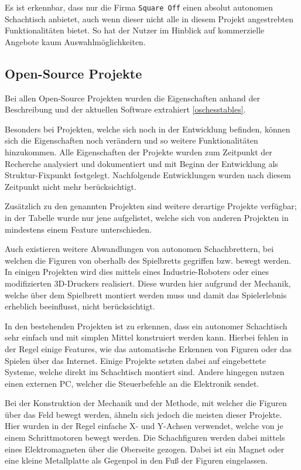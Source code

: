 Es ist erkennbar, dass nur die Firma
\passthrough{\lstinline!Square Off!} einen absolut autonomen Schachtisch
anbietet, auch wenn dieser nicht alle in diesem Projekt angestrebten
Funktionalitäten bietet. So hat der Nutzer im Hinblick auf kommerzielle
Angebote kaum Auswahlmöglichkeiten.

\hypertarget{open-source-projekte}{%
\subsection{Open-Source Projekte}\label{open-source-projekte}}

Bei allen Open-Source Projekten wurden die Eigenschaften anhand der
Beschreibung und der aktuellen Software extrahiert \ref{oschesstables}.

Besonders bei Projekten, welche sich noch in der Entwicklung befinden,
können sich die Eigenschaften noch verändern und so weitere
Funktionalitäten hinzukommen. Alle Eigenschaften der Projekte wurden zum
Zeitpunkt der Recherche analysiert und dokumentiert und mit Beginn der
Entwicklung als Struktur-Fixpunkt festgelegt. Nachfolgende Entwicklungen
wurden nach diesem Zeitpunkt nicht mehr berücksichtigt.

Zusätzlich zu den genannten Projekten sind weitere derartige Projekte
verfügbar; in der Tabelle wurde nur jene aufgelistet, welche sich von
anderen Projekten in mindestens einem Feature unterschieden.

Auch existieren weitere Abwandlungen von autonomen Schachbrettern, bei
welchen die Figuren von oberhalb des Spielbretts gegriffen bzw. bewegt
werden. In einigen Projekten wird dies mittels eines
Industrie-Roboters\cite{actprojectrobot} oder eines modifizierten
3D-Druckers\cite{atcproject3dprinter} realisiert. Diese wurden hier
aufgrund der Mechanik, welche über dem Spielbrett montiert werden muss
und damit das Spielerlebnis erheblich beeinflusst, nicht berücksichtigt.

In den bestehenden Projekten ist zu erkennen, dass ein autonomer
Schachtisch sehr einfach und mit simplen Mittel konstruiert werden kann.
Hierbei fehlen in der Regel einige Features, wie das automatische
Erkennen von Figuren oder das Spielen über das Internet. Einige Projekte
setzten dabei auf eingebettete Systeme, welche direkt im Schachtisch
montiert sind. Andere hingegen nutzen einen externen PC, welcher die
Steuerbefehle an die Elektronik sendet.

Bei der Konstruktion der Mechanik und der Methode, mit welcher die
Figuren über das Feld bewegt werden, ähneln sich jedoch die meisten
dieser Projekte. Hier wurden in der Regel einfache X- und Y-Achsen
verwendet, welche von je einem Schrittmotoren bewegt werden. Die
Schachfiguren werden dabei mittels eines Elektromagneten über die
Oberseite gezogen. Dabei ist ein Magnet oder eine kleine Metallplatte
als Gegenpol in den Fuß der Figuren eingelassen.

